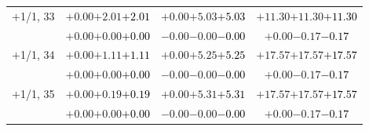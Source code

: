 \documentclass[compress]{beamer}
\begin{document}
\begin{frame}
\begin{tabular}{r | c | c | c}
$+$1/1, 33 & $+0.00$\hspace{0.1 cm}$+2.01$\hspace{0.1 cm}\textcolor{black}{$+2.01$} & $+0.00$\hspace{0.1 cm}$+5.03$\hspace{0.1 cm}\textcolor{black}{$+5.03$} & $+11.30$\hspace{0.1 cm}$+11.30$\hspace{0.1 cm}\textcolor{black}{$+11.30$} \\
           & $+0.00$\hspace{0.1 cm}$+0.00$\hspace{0.1 cm}\textcolor{black}{$+0.00$} & $-0.00$\hspace{0.1 cm}$-0.00$\hspace{0.1 cm}\textcolor{black}{$-0.00$} & $+0.00$\hspace{0.1 cm}$-0.17$\hspace{0.1 cm}\textcolor{black}{$-0.17$} \\
$+$1/1, 34 & $+0.00$\hspace{0.1 cm}$+1.11$\hspace{0.1 cm}\textcolor{black}{$+1.11$} & $+0.00$\hspace{0.1 cm}$+5.25$\hspace{0.1 cm}\textcolor{black}{$+5.25$} & $+17.57$\hspace{0.1 cm}$+17.57$\hspace{0.1 cm}\textcolor{black}{$+17.57$} \\
           & $+0.00$\hspace{0.1 cm}$+0.00$\hspace{0.1 cm}\textcolor{black}{$+0.00$} & $-0.00$\hspace{0.1 cm}$-0.00$\hspace{0.1 cm}\textcolor{black}{$-0.00$} & $+0.00$\hspace{0.1 cm}$-0.17$\hspace{0.1 cm}\textcolor{black}{$-0.17$} \\
$+$1/1, 35 & $+0.00$\hspace{0.1 cm}$+0.19$\hspace{0.1 cm}\textcolor{black}{$+0.19$} & $+0.00$\hspace{0.1 cm}$+5.31$\hspace{0.1 cm}\textcolor{black}{$+5.31$} & $+17.57$\hspace{0.1 cm}$+17.57$\hspace{0.1 cm}\textcolor{black}{$+17.57$} \\
           & $+0.00$\hspace{0.1 cm}$+0.00$\hspace{0.1 cm}\textcolor{black}{$+0.00$} & $-0.00$\hspace{0.1 cm}$-0.00$\hspace{0.1 cm}\textcolor{black}{$-0.00$} & $+0.00$\hspace{0.1 cm}$-0.17$\hspace{0.1 cm}\textcolor{black}{$-0.17$} \\

\end{tabular}
\end{frame}
\end{document}
